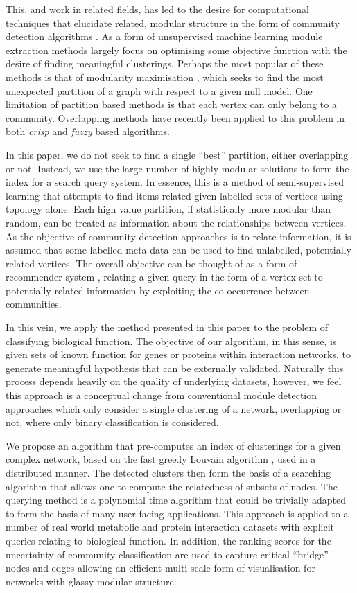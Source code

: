 \documentclass[manuscript, proceedings]{acmart}
\begin{document}
This, and work in related fields, has led to the desire for computational techniques that elucidate related, modular structure in the form of community detection algorithms \cite{fortunato2010community}.
As a form of unsupervised machine learning module extraction methods largely focus on optimising some objective function with the desire of finding meaningful clusterings.
Perhaps the most popular of these methods is that of modularity maximisation \cite{newman2004}, which seeks to find the most unexpected partition of a graph with respect to a given null model.
One limitation of partition based methods is that each vertex can only belong to a community.
Overlapping methods have recently been applied to this problem in both \textit{crisp} \cite{ahn2010link, lancichinetti2011finding} and \textit{fuzzy} \cite{gregory2011fuzzy} based algorithms.


In this paper, we do not seek to find a single ``best'' partition, either overlapping or not.
Instead, we use the large number of highly modular solutions to form the index for a search query system.
In essence, this is a method of semi-supervised learning that attempts to find items related given labelled sets of vertices using topology alone.
Each high value partition, if statistically more modular than random, can be treated as information about the relationships between vertices.
As the objective of community detection approaches is to relate information, it is assumed that some labelled meta-data can be used to find unlabelled, potentially related vertices.
The overall objective can be thought of as a form of recommender system \cite{ricci2011introduction}, relating a given query in the form of a vertex set to potentially related information by exploiting the co-occurrence between communities.

In this vein, we apply the method presented in this paper to the problem of classifying biological function.
The objective of our algorithm, in this sense, is given sets of known function for genes or proteins within interaction networks, to generate meaningful hypothesis that can be externally validated.
Naturally this process depends heavily on the quality of underlying datasets, however, we feel this approach is a conceptual change from conventional module detection approaches which only consider a single clustering of a network, overlapping or not, where only binary classification is considered.

We propose an algorithm that pre-computes an index of clusterings for a given complex network, based on the fast greedy Louvain algorithm \cite{blondel2008fast}, used in a distributed manner.
The detected clusters then form the basis of a searching algorithm that allows one to compute the relatedness of subsets of nodes.
The querying method is a polynomial time algorithm that could be trivially adapted to form the basis of many user facing applications.
This approach is applied to a number of real world metabolic and protein interaction datasets with explicit queries relating to biological function.
In addition, the ranking scores for the uncertainty of community classification are used to capture critical ``bridge'' nodes and edges allowing an efficient multi-scale form of visualisation for networks with glassy modular structure.
\end{document}
